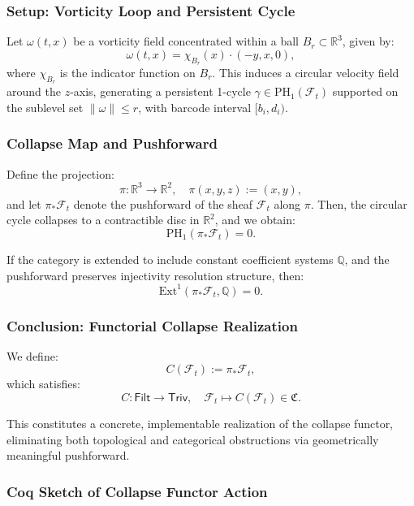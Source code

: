 \documentclass[11pt]{article}
\begin{document}
\subsubsection*{Setup: Vorticity Loop and Persistent Cycle}

Let \( \omega(t,x) \) be a vorticity field concentrated within a ball \( B_r \subset \mathbb{R}^3 \), given by:
\[
\omega(t,x) = \chi_{B_r}(x) \cdot (-y, x, 0),
\]
where \( \chi_{B_r} \) is the indicator function on \( B_r \). This induces a circular velocity field around the \( z \)-axis, generating a persistent 1-cycle \( \gamma \in \mathrm{PH}_1(\mathcal{F}_t) \) supported on the sublevel set \( \| \omega \| \leq r \), with barcode interval \( [b_i, d_i) \).

\subsubsection*{Collapse Map and Pushforward}

Define the projection:
\[
\pi : \mathbb{R}^3 \to \mathbb{R}^2, \quad \pi(x,y,z) := (x,y),
\]
and let \( \pi_* \mathcal{F}_t \) denote the pushforward of the sheaf \( \mathcal{F}_t \) along \( \pi \). Then, the circular cycle collapses to a contractible disc in \( \mathbb{R}^2 \), and we obtain:
\[
\mathrm{PH}_1(\pi_* \mathcal{F}_t) = 0.
\]

If the category is extended to include constant coefficient systems \( \mathbb{Q} \), and the pushforward preserves injectivity resolution structure, then:
\[
\mathrm{Ext}^1(\pi_* \mathcal{F}_t, \mathbb{Q}) = 0.
\]

\subsubsection*{Conclusion: Functorial Collapse Realization}

We define:
\[
C(\mathcal{F}_t) := \pi_* \mathcal{F}_t,
\]
which satisfies:
\[
C : \mathsf{Filt} \to \mathsf{Triv}, \quad \mathcal{F}_t \mapsto C(\mathcal{F}_t) \in \mathfrak{C}.
\]

This constitutes a concrete, implementable realization of the collapse functor, eliminating both topological and categorical obstructions via geometrically meaningful pushforward.

\subsubsection*{Coq Sketch of Collapse Functor Action}
\end{document}
